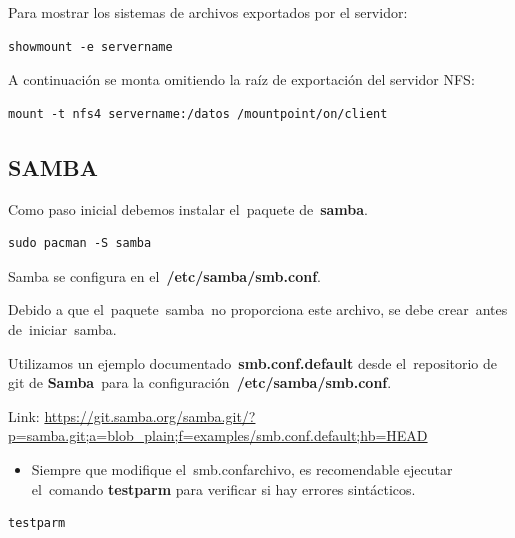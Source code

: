 \documentclass[12pt]{extarticle}
\providecommand{\tightlist}{%
      \setlength{\itemsep}{0pt}\setlength{\parskip}{0pt}}
\begin{document}
Para mostrar los sistemas de archivos exportados por el servidor:

\begin{verbatim}
showmount -e servername
\end{verbatim}

A continuación se monta omitiendo la raíz de exportación del servidor
NFS:

\begin{verbatim}
mount -t nfs4 servername:/datos /mountpoint/on/client
\end{verbatim}

\subsection{SAMBA}\label{samba}

Como paso inicial debemos instalar el~paquete de~\textbf{samba}.

\begin{verbatim}
sudo pacman -S samba
\end{verbatim}

Samba se configura en el~\textbf{/etc/samba/smb.conf}.

Debido a que el~paquete~samba~no proporciona este archivo, se debe
crear~antes de~iniciar~samba.

Utilizamos un ejemplo documentado~\textbf{smb.conf.default} desde
el~repositorio de git de \textbf{Samba}~para la
configuración~\textbf{/etc/samba/smb.conf}.

Link:
\url{https://git.samba.org/samba.git/?p=samba.git;a=blob_plain;f=examples/smb.conf.default;hb=HEAD}

\begin{itemize}
\tightlist
\item
  Siempre que modifique el~smb.confarchivo, es recomendable ejecutar
  el~comando \textbf{testparm} para verificar si hay errores
  sintácticos.
\end{itemize}

\begin{verbatim}
testparm
\end{verbatim}
\end{document}
